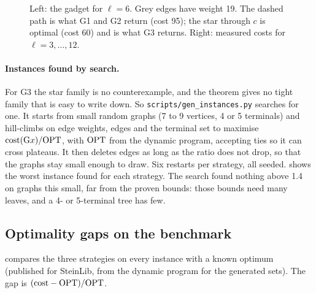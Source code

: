 \begin{figure}[!htbp]\centering
\begin{minipage}{0.36\linewidth}\centering
{}
\end{minipage}\hfill
\begin{minipage}{0.6\linewidth}

\end{minipage}
\caption{Left: the gadget for \(\ell=6\). Grey edges have weight 19. The dashed path is what G1 and G2 return (cost 95); the star
through \(c\) is optimal (cost 60) and is what G3 returns. Right: measured costs for \(\ell=3,\dots,12\).}\label{fig:star}
\end{figure}

\paragraph{Instances found by search.}
For G3 the star family is no counterexample, and the theorem gives no tight family that is easy to write down. So
\texttt{scripts/gen\_instances.py} searches for one. It starts from small random graphs (7 to 9 vertices, 4 or 5 terminals) and
hill-climbs on edge weights, edges and the terminal set to maximise \(\mathrm{cost}(\mathrm{G}x)/\mathrm{OPT}\), with \(\mathrm{OPT}\) from the
dynamic program, accepting ties so it can cross plateaus. It then deletes edges as long as the ratio does not drop, so that the
graphs stay small enough to draw. Six restarts per strategy, all seeded.  shows the worst instance found
for each strategy. The search found nothing above 1.4 on graphs this small, far from the proven bounds: those bounds need many leaves,
and a 4- or 5-terminal tree has few.



\subsection{Optimality gaps on the benchmark}\label{sec:gaps}
 compares the three strategies on every instance with a known optimum (published for SteinLib, from the dynamic
program for the generated sets). The gap is \((\mathrm{cost}-\mathrm{OPT})/\mathrm{OPT}\).

